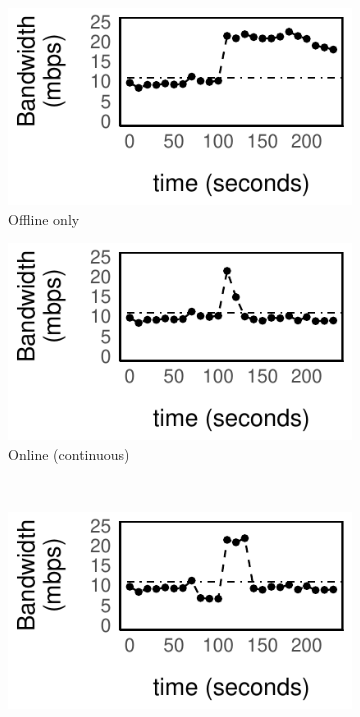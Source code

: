 \begin{figure}
  \centering
  \begin{subfigure}[t]{0.48\columnwidth}
    \centering
    \includegraphics[width=\textwidth]{figures/online1.pdf}
    \caption{Offline only}
    \label{fig:offline}
  \end{subfigure}
  \hfill
  \begin{subfigure}[t]{0.48\columnwidth}
    \centering
    \includegraphics[width=\textwidth]{figures/online2.pdf}
    \caption{Online (continuous)}
    \label{fig:online}
  \end{subfigure}
  \\
  \vspace{0.5em}
  \begin{subfigure}[t]{0.49\columnwidth}
    \includegraphics[width=\textwidth]{figures/online3.pdf}

\end{subfigure}
\end{figure}
